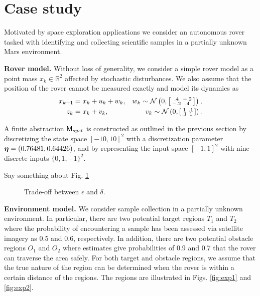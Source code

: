 \documentclass{ifacconf}
\begin{document}
\section{Case study}
\label{sec:case}

Motivated by space exploration applications we consider an autonomous rover tasked with identifying and collecting scientific samples in a partially unknown Mars environment.

\textbf{Rover model.} Without loss of generality, we consider a simple rover model as a point mass $x_k \in \mathbb{R}^2$ affected by stochastic disturbances. We also assume that the position of the rover cannot be measured exactly and model its dynamics as
\begin{equation*}
\begin{aligned}
  x_{k+1}&= x_{k} + u_k+ w_k,  & w_k \sim \mathcal{N} \left(0,\begin{bsmallmatrix}.4&-.2\\-.2&.4\end{bsmallmatrix}\right), \\
  z_k&= x_k+v_k, &  v_k \sim \mathcal{N} \left(0,\begin{bsmallmatrix}1&.1\\.1&1\end{bsmallmatrix}\right).
\end{aligned}
\end{equation*}

A finite abstraction $\mathsf{M}_{syst}$ is constructed as outlined in the previous section by discretizing the state space $[-10, 10]^2$ with a discretization parameter ${\boldsymbol{\eta}} = (0.76481, 0.64426)$, and by representing the input space $[-1,1]^2$ with nine discrete inputs $\{0, 1, -1\}^2$.

{\color{red}
Say something about Fig. \ref{fig:tradeoff}}

\begin{figure}
  
  \caption{Trade-off between $\epsilon$ and $\delta$.  }
  \label{fig:tradeoff}
\end{figure}

\textbf{Environment model.} We consider sample collection in a partially unknown environment. In particular, there are two potential target regions $T_1$ and $T_2$ where the probability of encountering a sample has been assessed via satellite imagery as 0.5 and 0.6, respectively. In addition, there are two potential obstacle regions $O_1$ and $O_2$ where estimates give probabilities of 0.9 and 0.7 that the rover can traverse the area safely. For both target and obstacle regions, we assume that the true nature of the region can be determined when the rover is within a certain distance of the regions. The regions are illustrated in Figs. \ref{fig:exp1} and \ref{fig:exp2}.
\end{document}
